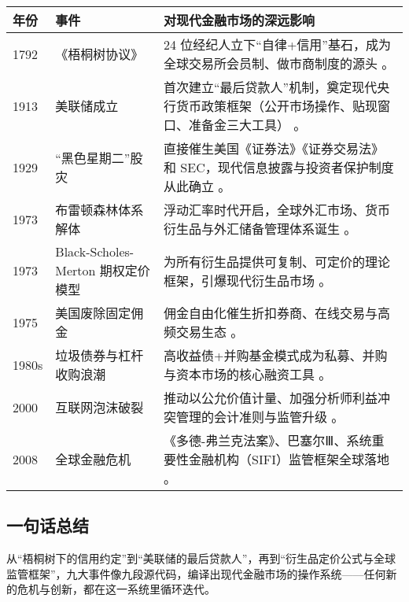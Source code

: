 \begin{table}[H]
\centering
\renewcommand{\arraystretch}{1.2}
\begin{tabular}{p{1.5cm}p{3.5cm}p{9.5cm}}
\toprule
\textbf{年份} & \textbf{事件} & \textbf{对现代金融市场的深远影响} \\ 
\midrule
1792 & 《梧桐树协议》 & 24 位经纪人立下“自律+信用”基石，成为全球交易所会员制、做市商制度的源头 。 \\ 
1913 & 美联储成立 & 首次建立“最后贷款人”机制，奠定现代央行货币政策框架（公开市场操作、贴现窗口、准备金三大工具） 。 \\ 
1929 & “黑色星期二”股灾 & 直接催生美国《证券法》《证券交易法》和 SEC，现代信息披露与投资者保护制度从此确立 。 \\
1973 & 布雷顿森林体系解体 & 浮动汇率时代开启，全球外汇市场、货币衍生品与外汇储备管理体系诞生 。 \\ 
1973 & Black-Scholes-Merton 期权定价模型 & 为所有衍生品提供可复制、可定价的理论框架，引爆现代衍生品市场 。 \\ 
1975 & 美国废除固定佣金 & 佣金自由化催生折扣券商、在线交易与高频交易生态 。 \\ 
1980s & 垃圾债券与杠杆收购浪潮 & 高收益债+并购基金模式成为私募、并购与资本市场的核心融资工具 。 \\ 
2000 & 互联网泡沫破裂 & 推动以公允价值计量、加强分析师利益冲突管理的会计准则与监管升级 。 \\ 
2008 & 全球金融危机 & 《多德-弗兰克法案》、巴塞尔Ⅲ、系统重要性金融机构（SIFI）监管框架全球落地 。 \\ 
\bottomrule
\end{tabular}
\end{table}

\subsection{一句话总结}
从“梧桐树下的信用约定”到“美联储的最后贷款人”，再到“衍生品定价公式与全球监管框架”，九大事件像九段源代码，编译出现代金融市场的操作系统——任何新的危机与创新，都在这一系统里循环迭代。

